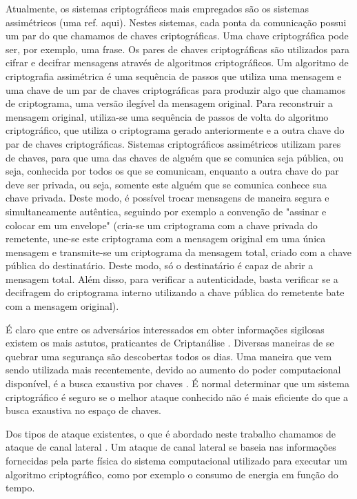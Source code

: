 Atualmente, os sistemas criptográficos mais empregados são os sistemas assimétricos (uma ref. aqui). Nestes sistemas, cada ponta da comunicação possui um par do que chamamos de chaves criptográficas. Uma chave criptográfica pode ser, por exemplo, uma frase. Os pares de chaves criptográficas são utilizados para cifrar e decifrar mensagens através de algoritmos criptográficos. Um algoritmo de criptografia assimétrica é uma sequência de passos que utiliza uma mensagem e uma chave de um par de chaves criptográficas para produzir algo que chamamos de criptograma, uma versão ilegível da mensagem original. Para reconstruir a mensagem original, utiliza-se uma sequência de passos de volta do algoritmo criptográfico, que utiliza o criptograma gerado anteriormente e a outra chave do par de chaves criptográficas. Sistemas criptográficos assimétricos utilizam pares de chaves, para que uma das chaves de alguém que se comunica seja pública, ou seja, conhecida por todos os que se comunicam, enquanto a outra chave do par deve ser privada, ou seja, somente este alguém que se comunica conhece sua chave privada. Deste modo, é possível trocar mensagens de maneira segura e simultaneamente autêntica, seguindo por exemplo a convenção de "assinar e colocar em um envelope" (cria-se um criptograma com a chave privada do remetente, une-se este criptograma com a mensagem original em uma única mensagem e transmite-se um criptograma da mensagem total, criado com a chave pública do destinatário. Deste modo, só o destinatário é capaz de abrir a mensagem total. Além disso, para verificar a autenticidade, basta verificar se a decifragem do criptograma interno utilizando a chave pública do remetente bate com a mensagem original).

É claro que entre os adversários interessados em obter informações sigilosas existem os mais astutos, praticantes de Criptanálise \cite{cryptanalysis}. Diversas maneiras de se quebrar uma segurança são descobertas todos os dias. Uma maneira que vem sendo utilizada mais recentemente, devido ao aumento do poder computacional disponível, é a busca exaustiva por chaves \cite{agosta2012exploiting}. É normal determinar que um sistema criptográfico é seguro se o melhor ataque conhecido não é mais eficiente do que a busca exaustiva no espaço de chaves.

Dos tipos de ataque existentes, o que é abordado neste trabalho chamamos de ataque de canal lateral \cite{mohamed2013improved}. Um ataque de canal lateral se baseia nas informações fornecidas pela parte física do sistema computacional utilizado para executar um algoritmo criptográfico, como por exemplo o consumo de energia em função do tempo.

